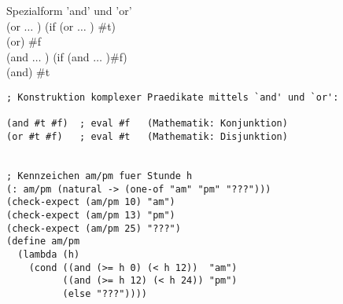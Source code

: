 Spezialform 'and' und 'or' \\
(or   $\ldots$ ) \eval (if  (or  $\ldots$ ) \#t)\\
(or) \eval \#f \\
(and   $\ldots$ ) \eval (if  (and  $\ldots$ )\#f)\\
(and) \eval \#t
\begin{lstlisting}[frame=single]          
; Konstruktion komplexer Praedikate mittels `and' und `or':

(and #t #f)  ; eval #f   (Mathematik: Konjunktion)
(or #t #f)   ; eval #t   (Mathematik: Disjunktion)


; Kennzeichen am/pm fuer Stunde h
(: am/pm (natural -> (one-of "am" "pm" "???")))
(check-expect (am/pm 10) "am")
(check-expect (am/pm 13) "pm")
(check-expect (am/pm 25) "???")
(define am/pm
  (lambda (h)
    (cond ((and (>= h 0) (< h 12))  "am")
          ((and (>= h 12) (< h 24)) "pm")
          (else "???"))))
\end{lstlisting}